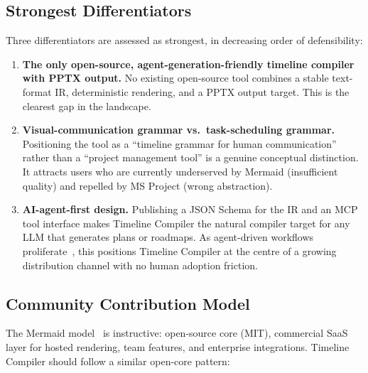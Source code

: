 \subsection{Strongest Differentiators}
\label{sec:oss-differentiators}

Three differentiators are assessed as strongest, in decreasing order of
defensibility:

\begin{enumerate}
  \item \textbf{The only open-source, agent-generation-friendly timeline
        compiler with PPTX output.}
        No existing open-source tool combines a stable text-format IR,
        deterministic rendering, and a PPTX output target.
        This is the clearest gap in the landscape.

  \item \textbf{Visual-communication grammar vs.\ task-scheduling grammar.}
        Positioning the tool as a ``timeline grammar for human communication''
        rather than a ``project management tool'' is a genuine conceptual
        distinction.
        It attracts users who are currently underserved by Mermaid
        (insufficient quality) and repelled by MS Project (wrong abstraction).

  \item \textbf{AI-agent-first design.}
        Publishing a JSON Schema for the IR and an MCP tool interface makes
        Timeline Compiler the natural compiler target for any LLM that
        generates plans or roadmaps.
        As agent-driven workflows proliferate~\cite{mcp-spec}, this
        positions Timeline Compiler at the centre of a growing
        distribution channel with no human adoption friction.
\end{enumerate}

\subsection{Community Contribution Model}
\label{sec:oss-community}

The Mermaid model~\cite{mermaidchart2024} is instructive: open-source core
(MIT), commercial SaaS layer for hosted rendering, team features, and
enterprise integrations.
Timeline Compiler should follow a similar open-core pattern:

